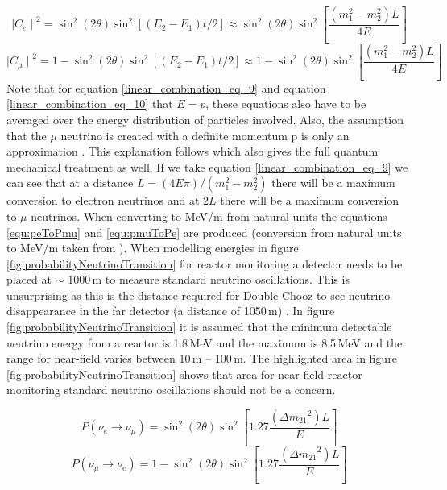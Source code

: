 \begin{equation}
   {\mid{C_e}\mid}^2 = \sin^2(2\theta)\sin^2[(E_2-E_1)t/2] \approx \sin^2(2\theta)\sin^2\left[\frac{(m_1^2-m_2^2)L}{4E}\right]
    \label{linear_combination_eq_9}
\end{equation}
\begin{equation}
    {\mid{C_\mu}\mid}^2 = 1 - \sin^2(2\theta)\sin^2[(E_2-E_1)t/2] \approx 1 - \sin^2(2\theta)\sin^2\left[\frac{(m_1^2-m_2^2)L}{4E}\right]
    \label{linear_combination_eq_10}
\end{equation}
Note that for equation \ref{linear_combination_eq_9} and equation \ref{linear_combination_eq_10} that $E = p$, these equations also have to be averaged over the energy distribution of particles involved. Also, the assumption that the $\mu$ neutrino is created with a definite momentum p is only an approximation \cite{sassaroli1999neutrino}. This explanation follows \cite{sassaroli1999neutrino} which also gives the full quantum mechanical treatment as well. If we take equation \ref{linear_combination_eq_9} we can see that at a distance $L = (4E\pi) / (m_1^2 - m_2^2)$ there will be a maximum conversion to electron neutrinos and at $2L$ there will be a maximum conversion to $\mu$ neutrinos. When converting to MeV/m from natural units the equations \ref{equ:peToPmu} and \ref{equ:pmuToPe} are produced (conversion from natural units to MeV/m taken from \cite{steveBoydLectureNotes}). When modelling energies in figure \ref{fig:probabilityNeutrinoTransition} for reactor monitoring a detector needs to be placed at $\sim$ 1000\,m to measure standard neutrino oscillations. This is unsurprising as this is the distance required for Double Chooz to see neutrino disappearance in the far detector (a distance of 1050\,m) \cite{lasserre2006} \cite{Abe_2012} \cite{abe2014improved}. In figure \ref{fig:probabilityNeutrinoTransition} it is assumed that the minimum detectable neutrino energy from a reactor is 1.8\,MeV and the maximum is 8.5\,MeV and the range for near-field varies between 10\,m -- 100\,m. The highlighted area in figure \ref{fig:probabilityNeutrinoTransition} shows that area for near-field reactor monitoring standard neutrino oscillations should not be a concern. 

\begin{equation}
    P(\nu_e \rightarrow \nu_\mu) = \sin^2(2\theta)\sin^2\left[1.27\frac{({\Delta m_{21}}^2)L}{E}\right]
    \label{equ:peToPmu}
\end{equation}
\begin{equation}
    P(\nu_\mu \rightarrow \nu_e) = 1 -  \sin^2(2\theta)\sin^2\left[1.27\frac{({\Delta m_{21}}^2)L}{E}\right]
    \label{equ:pmuToPe}
\end{equation}

